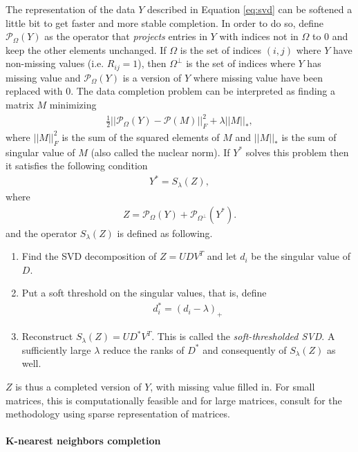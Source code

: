 The representation of the data $Y$ described in Equation \eqref{eq:svd}
can be softened a little bit to get faster and more stable completion. In order
to do so, define $\mathcal{P}_\Omega(Y)$ as the operator that \emph{projects}
entries in $Y$ with indices not in $\Omega$ to $0$ and keep the other elements
unchanged. If $\Omega$ is the set of indices $(i, j)$ where $Y$ have
non-missing values (i.e. $R_{ij}=1$), then $\Omega^{\perp}$ is the set of
indices where $Y$ has missing value and $\mathcal{P}_{\Omega}(Y)$ is a version of
$Y$ where missing value have been replaced with $0$. The data completion
problem can be interpreted as finding a matrix $M$ minimizing
\begin{align*}
\frac{1}{2} \vert\vert \mathcal{P}_\Omega(Y) - \mathcal{P}(M) \vert\vert_F^2 + \lambda \vert \vert M \vert \vert_*,
\end{align*}
where $\vert\vert M \vert \vert^2_F$ is the sum of the squared elements of $M$
and $\vert \vert M \vert \vert_*$ is the sum of singular value of $M$ (also
called the nuclear norm). If $Y^*$ solves this problem then it satisfies the
following condition
\begin{align*}
  Y^* = S_{\lambda}(Z),
\end{align*}
where
\begin{align*}
Z = \mathcal{P}_{\Omega}(Y) + \mathcal{P}_{\Omega^{\perp}}(Y^*).
\end{align*}
and the operator $S_\lambda(Z)$ is defined as following.

\begin{enumerate}
\item Find the SVD decomposition of $Z = UDV^T$ and let $d_i$ be the singular
  value of $D$.
\item Put a soft threshold on the singular values, that is, define
  \begin{align*}
    d_i^* = (d_i - \lambda)_+
  \end{align*}
\item Reconstruct $S_\lambda(Z) = UD^*V^T$. This is called the
  \emph{soft-thresholded SVD}. A sufficiently large $\lambda$ reduce the ranks
  of $D^*$ and consequently of $S_\lambda(Z)$ as well.
\end{enumerate}
$Z$ is thus a completed version of $Y$, with missing value filled in. For small
matrices, this is computationally feasible and for large matrices, consult
\cite{hastie2015softimpute} for the methodology using sparse representation of matrices.

\paragraph{K-nearest neighbors completion}

